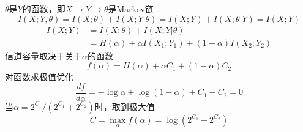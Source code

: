 \documentclass[a4paper]{exam}
\begin{document}
\begin{CJK*}{UTF8}{gbsn}
\begin{questions}
\begin{solution}
  $\theta$是$Y$的函数，即$X \to Y \to \theta $是Markov链
  \[I(X;Y,\theta ) = I(X;\theta ) + I(X;Y|\theta ) = I(X;Y) + I(X;\theta |Y) = I(X;Y)\]
  \begin{equation*}
  \begin{split}
  I(X;Y) &= I(X;\theta ) + I(X;Y|\theta )\\
  &= H(\alpha) + \alpha I({X_1};{Y_1}) + (1 - \alpha )I({X_2};{Y_2})
  \end{split}
  \end{equation*}
  信道容量取决于关于$\alpha$的函数
  \[f(\alpha ) = H(\alpha ) + \alpha {C_1} + (1 - \alpha ){C_2}\]
  对函数求极值优化 \[\frac{{df}}{{d\alpha }} =  - \log \alpha  + \log (1 - \alpha ) + {C_1} - {C_2} = 0\]
  当$\alpha  = {2^{{C_1}}}/({2^{{C_1}}} + {2^{{C_2}}})$时，取到极大值
  \[C = \mathop {\max }\limits_\alpha  f(\alpha ) = \log ({2^{{C_1}}} + {2^{{C_2}}})\]
    \end{solution}
    
\end{questions}
\end{CJK*}
\end{document}
